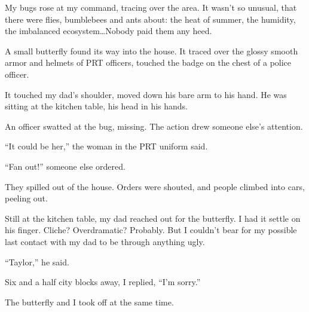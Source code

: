 My bugs rose at my command, tracing over the area.  It wasn't so unusual, that there were flies, bumblebees and ants about: the heat of summer, the humidity, the imbalanced ecosystem\ldots  Nobody paid them any heed.



A small butterfly found its way into the house.  It traced over the glossy smooth armor and helmets of PRT officers, touched the badge on the chest of a police officer.



It touched my dad's shoulder, moved down his bare arm to his hand.  He was sitting at the kitchen table, his head in his hands.



An officer swatted at the bug, missing.  The action drew someone else's attention.



``It could be her,'' the woman in the PRT uniform said.



``Fan out!'' someone else ordered.



They spilled out of the house.  Orders were shouted, and people climbed into cars, peeling out.



Still at the kitchen table, my dad reached out for the butterfly.  I had it settle on his finger.  Cliche?  Overdramatic?  Probably.  But I couldn't bear for my possible last contact with my dad to be through anything ugly.



``Taylor,'' he said.



Six and a half city blocks away, I replied, ``I'm sorry.''



The butterfly and I took off at the same time.





